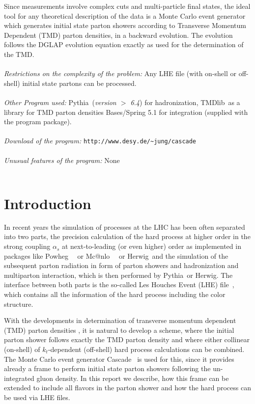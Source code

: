 \documentclass[11pt]{article} \usepackage{mystyle-new}
\makeatletter
\def\prp{t}
\newcommand{\kt}{k_{t}}
\def\kt{\ensuremath{k_{\prp}}}
\def\cascade{{\sc Cascade}}
\def\PYTHIA{{\sc Pythia}}
\def\tmdlib{{\sc TMDlib}}
\def\powheg{{\sc Powheg}}
\def\herwig{{\sc Herwig}}
\def\pythia{{\sc Pythia}}
\def\mcatnlo{{\sc Mc@nlo}}
\makeatother
\begin{document}
Since measurements involve complex cuts and multi-particle final states, the 
ideal tool for any theoretical description of the data is a Monte Carlo 
event generator which generates initial state parton showers according to Transverse Momentum Dependent (TMD) parton densities, in a backward evolution. The evolution follows the DGLAP evolution equation exactly as used for the determination of the TMD. \\ \\
{\em Restrictions on the complexity of the problem:}  
Any LHE file (with on-shell or off-shell) initial state partons can be processed.\\ \\
{\em Other Program used:}  \PYTHIA\ ({\it version $>$ 6.4}) for hadronization, 
\tmdlib\ as a library for TMD parton densities 
{\sc Bases/Spring}  5.1 
for integration (supplied with the program package).\\ \\ 
{\em Download of the program:} \verb+http://www.desy.de/~jung/cascade+\\ \\
{\em Unusual features of the program:}   None \\ \\
\newpage


\section{Introduction}

In recent years the simulation of processes at the LHC has been often separated into two parts,
the precision calculation of the hard process at higher order in the strong coupling $\alpha_s$ at
next-to-leading (or even higher) order as implemented in packages like \powheg\ ~ or \mcatnlo\ ~ or 
\herwig\, and the simulation of the subsequent parton radiation in form of parton showers and 
hadronization and multiparton interaction, which is then performed by \pythia\ or \herwig .  
The interface between both parts is the so-called 
Les Houches Event (LHE) file~\cite{Alwall:2006yp}, which contains all the information of the hard process including the
color structure.  

With the developments
in determination of transverse momentum dependent (TMD) parton densities  \cite{Hautmann:2017fcj,Hautmann:2017xtx}, it is natural to
develop a scheme, where the initial parton shower follows exactly the TMD parton density and 
where either collinear (on-shell) of \kt-dependent (off-shell) hard process calculations can be
combined. The Monte Carlo event generator \cascade\  is used for this, since it provides already
a frame to perform initial state parton showers following the un-integrated gluon density. 
In this report we describe, how this frame can be extended to include all flavors in the parton shower
and how the hard process can be used via LHE files.
\end{document}
